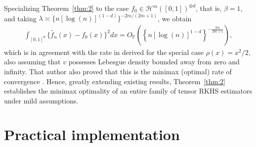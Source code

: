 \documentclass[11pt]{article}
\theoremstyle{definition}
\theoremstyle{remark}
\begin{document}
Specializing Theorem~\ref{thm:2} to the case $f_0 \in \mathcal{H}^m([0,1])^{\otimes d}$, that is, $\beta = 1$, and taking $\lambda \asymp \{n[\log(n)]^{(1-d)}\}^{-2m/(2m+1)}$, we obtain
\begin{align*}
\int_{[0,1]^d} \{\widehat{f}_n(x) - f_0(x)\}^2 dx = O_{\mathbb{P}} \left( \left\{n [\log(n) ]^{1-d} \right\}^{-\frac{2m}{2m+1}}\right),
\end{align*}
which is in agreement with the rate in \citep[Theorem 1.2]{Lin:2000} derived for the special case $\rho(x) = x^2/2$, also assuming that $v$ possesses Lebesgue density bounded away from zero and infinity. That author also proved that this is the minimax (optimal) rate of convergence \citep[Theorem 1.1]{Lin:2000}. Hence, greatly extending existing results, Theorem~\ref{thm:2} establishes the minimax optimality of an entire family of tensor RKHS estimators under mild assumptions.

\section{Practical implementation}
\end{document}
